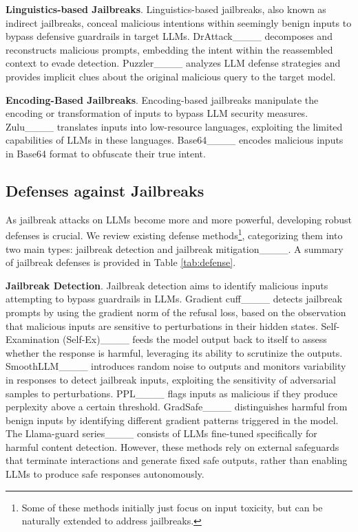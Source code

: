 \noindent\textbf{Linguistics-based Jailbreaks}. Linguistics-based jailbreaks, also known as indirect jailbreaks, conceal malicious intentions within seemingly benign inputs to bypass defensive guardrails in target LLMs. DrAttack____ decomposes and reconstructs malicious prompts, embedding the intent within the reassembled context to evade detection. Puzzler____ analyzes LLM defense strategies and provides implicit clues about the original malicious query to the target model.

\noindent\textbf{Encoding-Based Jailbreaks}. Encoding-based jailbreaks manipulate the encoding or transformation of inputs to bypass LLM security measures. Zulu____ translates inputs into low-resource languages, exploiting the limited capabilities of LLMs in these languages. Base64____ encodes malicious inputs in Base64 format to obfuscate their true intent.



\subsection{Defenses against Jailbreaks}

As jailbreak attacks on LLMs become more and more powerful, developing robust defenses is crucial. We review existing defense methods\footnote{Some of these methods initially just focus on input toxicity, but can be naturally extended to address jailbreaks.}, categorizing them into two main types: jailbreak detection and jailbreak mitigation____. A summary of jailbreak defenses is provided in Table \ref{tab:defense}.

\noindent\textbf{Jailbreak Detection}. 
Jailbreak detection aims to identify malicious inputs attempting to bypass guardrails in LLMs. Gradient cuff____ detects jailbreak prompts by using the gradient norm of the refusal loss, based on the observation that malicious inputs are sensitive to perturbations in their hidden states. Self-Examination (Self-Ex)____ feeds the model output back to itself to assess whether the response is harmful, leveraging its ability to scrutinize the outputs. SmoothLLM____ introduces random noise to outputs and monitors variability in responses to detect jailbreak inputs, exploiting the sensitivity of adversarial samples to perturbations. PPL____ flags inputs as malicious if they produce perplexity above a certain threshold. GradSafe____ distinguishes harmful from benign inputs by identifying different gradient patterns triggered in the model. The Llama-guard series____ consists of LLMs fine-tuned specifically for harmful content detection. However, these methods rely on external safeguards that terminate interactions and generate fixed safe outputs, rather than enabling LLMs to produce safe responses autonomously.

